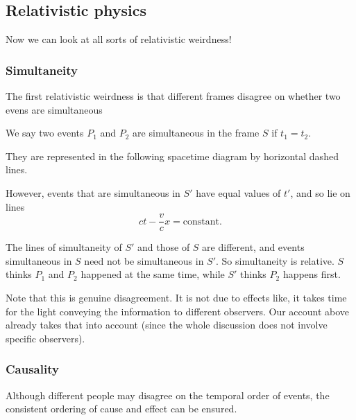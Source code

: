 \documentclass[a4paper]{article}
\begin{document}
\subsection{Relativistic physics}
Now we can look at all sorts of relativistic weirdness!
\subsubsection*{Simultaneity}
The first relativistic weirdness is that different frames disagree on whether two evens are simultaneous
\begin{defi}
  We say two events $P_1$ and $P_2$ are simultaneous in the frame $S$ if $t_1 = t_2$.
\end{defi}
They are represented in the following spacetime diagram by horizontal dashed lines.

However, events that are simultaneous in $S'$ have equal values of $t'$, and so lie on lines
\[
  ct - \frac{v}{c}x = \text{constant}.
\]
\begin{center}
\end{center}
The lines of simultaneity of $S'$ and those of $S$ are different, and events simultaneous in $S$ need not be simultaneous in $S'$. So simultaneity is relative. $S$ thinks $P_1$ and $P_2$ happened at the same time, while $S'$ thinks $P_2$ happens first.

Note that this is genuine disagreement. It is not due to effects like, it takes time for the light conveying the information to different observers. Our account above already takes that into account (since the whole discussion does not involve specific observers).

\subsubsection*{Causality}
Although different people may disagree on the temporal order of events, the consistent ordering of cause and effect can be ensured.
\end{document}
